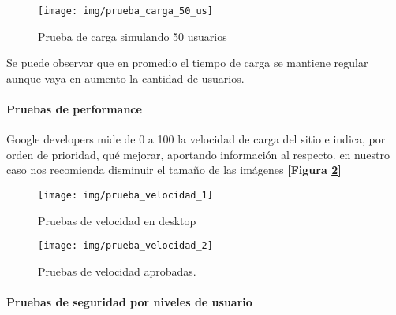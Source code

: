   \begin{figure}[h]
  	\centering
  	\texttt{[image: img/prueba\_carga\_50\_us]}
  	\caption{Prueba de carga simulando 50 usuarios}
  	\label{retro_prueba_carga_50_us}
  \end{figure}
  
  Se puede observar que en promedio el tiempo de carga se mantiene regular aunque vaya en aumento la cantidad de usuarios.
  
  \paragraph{Pruebas de performance}
  Google developers mide de 0 a 100 la velocidad de carga del sitio e indica, por orden de prioridad, qué mejorar, aportando información al respecto.
  en nuestro caso nos recomienda disminuir el tamaño de las imágenes \textbf{[Figura \ref{retro_prueba_velocidad_1}]}
  
  \newpage
  
  \begin{figure}[h]
  	\centering
  	\texttt{[image: img/prueba\_velocidad\_1]}
  	\caption{Pruebas de velocidad en desktop}
  	\label{retro_prueba_velocidad_1}
  \end{figure}
  
  \begin{figure}[h]
  	\centering
  	\texttt{[image: img/prueba\_velocidad\_2]}
  	\caption{Pruebas de velocidad aprobadas.}
  	\label{retro_prueba_velocidad_2}
  \end{figure}
  
  
  \paragraph{Pruebas de seguridad por niveles de usuario}
  
